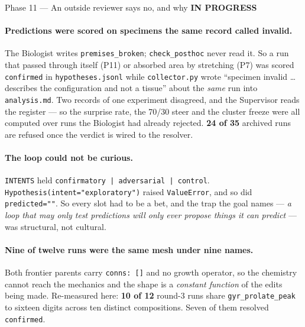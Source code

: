 \documentclass[11pt,a4paper]{article}
\newcommand{\code}[1]{\texttt{#1}}
\newcommand{\prog}{\textcolor{warn}{\textbf{IN PROGRESS}}}
\begin{document}
\begin{phasebox}{Phase 11 --- An outside reviewer says no, and why \hfill \prog}
\paragraph{Predictions were scored on specimens the same record called invalid.} The Biologist
writes \code{premises\_broken}; \code{check\_posthoc} never read it. So a run that passed through
itself (P11) or absorbed area by stretching (P7) was scored \code{confirmed} in
\code{hypotheses.jsonl} while \code{collector.py} wrote ``specimen invalid \ldots describes the
configuration and not a tissue'' about the \emph{same} run into \code{analysis.md}. Two records of
one experiment disagreed, and the Supervisor reads the register --- so the surprise rate, the 70/30
steer and the cluster freeze were all computed over runs the Biologist had already rejected.
\textbf{24 of 35} archived runs are refused once the verdict is wired to the resolver.

\paragraph{The loop could not be curious.} \code{INTENTS} held
\code{confirmatory\,|\,adversarial\,|\,control}. \code{Hypothesis(intent="exploratory")} raised
\code{ValueError}, and so did \code{predicted=""}. So every slot had to be a bet, and the trap the
goal names --- \emph{a loop that may only test predictions will only ever propose things it can
predict} --- was structural, not cultural.

\paragraph{Nine of twelve runs were the same mesh under nine names.} Both frontier parents carry
\code{conns: []} and no growth operator, so the chemistry cannot reach the mechanics and the shape
is a \emph{constant function} of the edits being made. Re-measured here: \textbf{10 of 12} round-3
runs share \code{gyr\_prolate\_peak} to sixteen digits across ten distinct compositions. Seven of
them resolved \code{confirmed}.


\end{phasebox}
\end{document}
